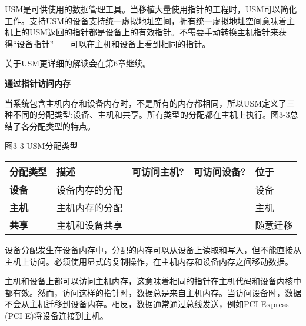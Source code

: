 USM是可供使用的数据管理工具。当移植大量使用指针的工程时，USM可以简化工作。支持USM的设备支持统一虚拟地址空间，拥有统一虚拟地址空间意味着主机上的USM返回的指针都是设备上的有效指针。不需要手动转换主机指针来获得“设备指针”——可以在主机和设备上看到相同的指针。\par

关于USM更详细的解读会在第6章继续。\par

\hspace*{\fill} \par %
\textbf{通过指针访问内存}

当系统包含主机内存和设备内存时，不是所有的内存都相同，所以USM定义了三种不同的分配类型:设备、主机和共享。所有类型的分配都在主机上执行。图3-3总结了各分配类型的特点。\par

\hspace*{\fill} \par %
图3-3 USM分配类型
\begin{table}[H]
	\begin{tabular}{|l|l|l|l|l|}
		\hline
		\textbf{分配类型} & \textbf{描述}                       & \textbf{可访问主机?} & \textbf{可访问设备?} & \textbf{位于}        \\ \hline
		\textbf{设备}          & 设备内存的分配               & \XSolidBrush                       & \Checkmark                              & 设备                     \\ \hline
		\textbf{主机}            & 主机内存的分配                & \Checkmark                            & \Checkmark                               & 主机                       \\ \hline
		\textbf{共享}          & 主机和设备共享 & \Checkmark                            & \Checkmark                               & 随意迁移 \\ \hline
	\end{tabular}
\end{table}

设备分配发生在设备内存中，分配的内存可以从设备上读取和写入，但不能直接从主机上访问。必须使用显式的复制操作，在主机内存和设备内存之间移动数据。\par

主机和设备上都可以访问主机内存，这意味着相同的指针在主机代码和设备内核中都有效。然而，访问这样的指针时，数据总是来自主机内存。当访问设备时，数据不会从主机迁移到设备内存。相反，数据通常通过总线发送，例如PCI-Express (PCI-E)将设备连接到主机。\par

